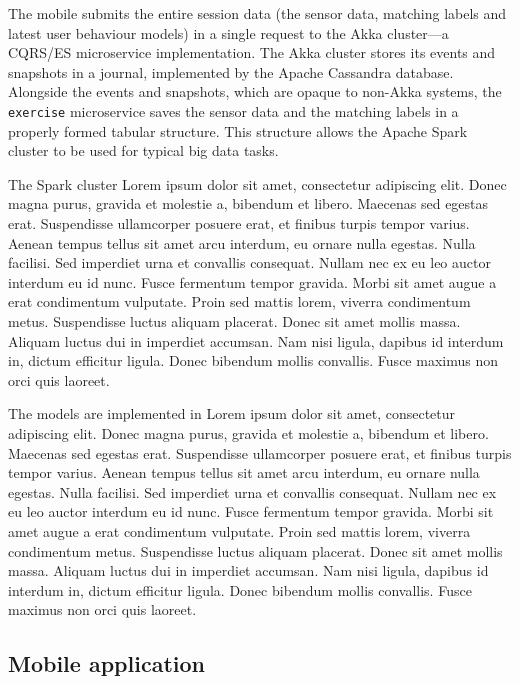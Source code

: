\documentclass[a4paper, 10 pt, conference]{IEEEtran}
\begin{document}
The mobile submits the entire session data (the sensor data, matching labels and latest user behaviour models) in a single request to the Akka \cite{akka} cluster---a CQRS/ES \cite{cqrs-es} microservice implementation. The Akka cluster stores its events and snapshots in a journal, implemented by the Apache Cassandra \cite{apache-cassandra} database. Alongside the events and snapshots, which are opaque to non-Akka systems, the \texttt{exercise} microservice saves the sensor data and the matching labels in a properly formed tabular structure. This structure allows the Apache Spark \cite{apache-spark} cluster to be used for typical big data tasks.

The Spark cluster Lorem ipsum dolor sit amet, consectetur adipiscing elit. Donec magna purus, gravida et molestie a, bibendum et libero. Maecenas sed egestas erat. Suspendisse ullamcorper posuere erat, et finibus turpis tempor varius. Aenean tempus tellus sit amet arcu interdum, eu ornare nulla egestas. Nulla facilisi. Sed imperdiet urna et convallis consequat. Nullam nec ex eu leo auctor interdum eu id nunc. Fusce fermentum tempor gravida. Morbi sit amet augue a erat condimentum vulputate. Proin sed mattis lorem, viverra condimentum metus. Suspendisse luctus aliquam placerat. Donec sit amet mollis massa. Aliquam luctus dui in imperdiet accumsan. Nam nisi ligula, dapibus id interdum in, dictum efficitur ligula. Donec bibendum mollis convallis. Fusce maximus non orci quis laoreet.

The models are implemented in Lorem ipsum dolor sit amet, consectetur adipiscing elit. Donec magna purus, gravida et molestie a, bibendum et libero. Maecenas sed egestas erat. Suspendisse ullamcorper posuere erat, et finibus turpis tempor varius. Aenean tempus tellus sit amet arcu interdum, eu ornare nulla egestas. Nulla facilisi. Sed imperdiet urna et convallis consequat. Nullam nec ex eu leo auctor interdum eu id nunc. Fusce fermentum tempor gravida. Morbi sit amet augue a erat condimentum vulputate. Proin sed mattis lorem, viverra condimentum metus. Suspendisse luctus aliquam placerat. Donec sit amet mollis massa. Aliquam luctus dui in imperdiet accumsan. Nam nisi ligula, dapibus id interdum in, dictum efficitur ligula. Donec bibendum mollis convallis. Fusce maximus non orci quis laoreet.

\subsection{Mobile application}
\end{document}
